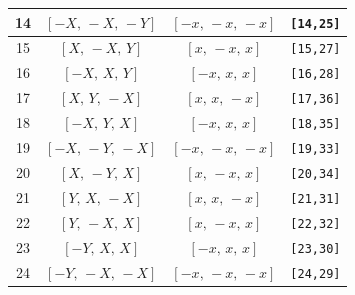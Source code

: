 \documentclass[fleqn,8pt]{jsarticle}
\begin{document}
\begin{longtable}{cccc}
14 & $\left[ - X,\, - X,\, - Y \right]$ & $\left[ - x,\, - x,\, - x \right]$ & {\tt [14,25]} \\ \hline
15 & $\left[ X,\, - X,\, Y \right]$ & $\left[ x,\, - x,\, x \right]$ & {\tt [15,27]} \\ \hline
16 & $\left[ - X,\, X,\, Y \right]$ & $\left[ - x,\, x,\, x \right]$ & {\tt [16,28]} \\ \hline
17 & $\left[ X,\, Y,\, - X \right]$ & $\left[ x,\, x,\, - x \right]$ & {\tt [17,36]} \\ \hline
18 & $\left[ - X,\, Y,\, X \right]$ & $\left[ - x,\, x,\, x \right]$ & {\tt [18,35]} \\ \hline
19 & $\left[ - X,\, - Y,\, - X \right]$ & $\left[ - x,\, - x,\, - x \right]$ & {\tt [19,33]} \\ \hline
20 & $\left[ X,\, - Y,\, X \right]$ & $\left[ x,\, - x,\, x \right]$ & {\tt [20,34]} \\ \hline
21 & $\left[ Y,\, X,\, - X \right]$ & $\left[ x,\, x,\, - x \right]$ & {\tt [21,31]} \\ \hline
22 & $\left[ Y,\, - X,\, X \right]$ & $\left[ x,\, - x,\, x \right]$ & {\tt [22,32]} \\ \hline
23 & $\left[ - Y,\, X,\, X \right]$ & $\left[ - x,\, x,\, x \right]$ & {\tt [23,30]} \\ \hline
24 & $\left[ - Y,\, - X,\, - X \right]$ & $\left[ - x,\, - x,\, - x \right]$ & {\tt [24,29]} \\
\end{longtable}
\renewcommand{\arraystretch}{1.2}
\end{document}
